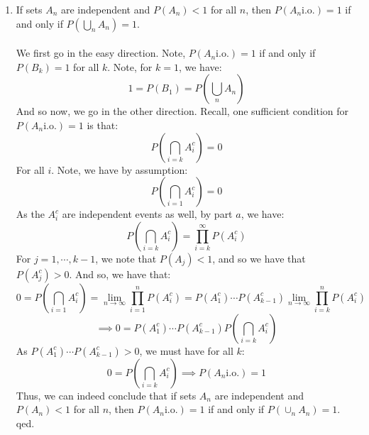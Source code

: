 \documentclass[12pt,a4paper]{article}
\newcommand{\1}[1]{\mathbbm{1}\left\{ #1 \right\}}
\newcommand{\io}{\text{i.o.}}
\begin{document}
\begin{enumerate}
	\item If sets $A_n$ are independent and $P(A_n) < 1$ for all $n$, then $P(A_n \io) = 1$ if and only if $P(\bigcup_n A_n) = 1$.
	\\\\
	We first go in the easy direction. Note, $P(A_n \io) = 1$ if and only if $P(B_k) = 1$ for all $k$. Note, for $k = 1$, we have:
	$$
		1 = P(B_1) = P\left(\bigcup_n A_n\right)
	$$
	And so now, we go in the other direction. Recall, one sufficient condition for $P(A_n \io) = 1$ is that:
	$$
		P\left(\bigcap_{i=k} A_i^c\right) = 0
	$$
	For all $i$. Note, we have by assumption:
	$$
		P\left(\bigcap_{i=1} A_i^c\right) = 0
	$$
	As the $A_i^c$ are independent events as well, by part $a$, we have:
	$$
		P\left(\bigcap_{i=k} A_i^c\right) = \prod_{i=k}^\infty P(A_i^c)
	$$
	For $j = 1, \cdots, k-1$, we note that $P(A_j) < 1$, and so we have that $P(A_j^c) > 0$. And so, we have that:
	$$
		0 = P\left(\bigcap_{i=1} A_i^c\right) =
		\lim_{n \to \infty} \prod_{i=1}^n P(A_i^c) =
		P(A_1^c) \cdots P(A_{k-1}^c) \lim_{n \to \infty} \prod_{i=k}^n P(A_i^c)
	$$
	$$
		\implies
		0 = P(A_1^c) \cdots P(A_{k-1}^c) P\left(\bigcap_{i=k} A_i^c\right)
	$$
	As $P(A_1^c) \cdots P(A_{k-1}^c) > 0$, we must have for all $k$:
	$$
		0 = P\left(\bigcap_{i=k} A_i^c\right) \implies P(A_n \io) = 1
	$$
	Thus, we can indeed conclude that if sets $A_n$ are independent and $P(A_n) < 1$ for all $n$, then $P(A_n \io) = 1$ if and only if $P(\cup_n A_n) = 1$. qed.
\end{enumerate}
\end{document}
